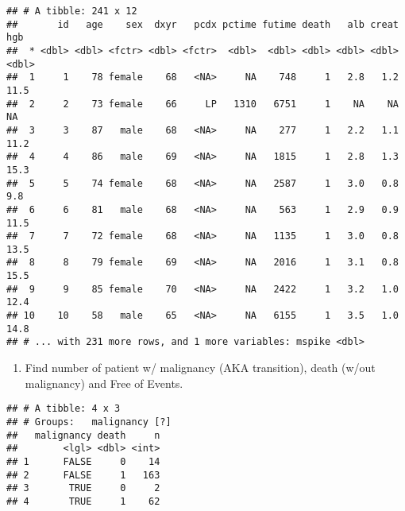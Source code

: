 \documentclass[]{book}
\newenvironment{Shaded}{\begin{snugshade}}{\end{snugshade}}
\newcommand{\KeywordTok}[1]{\textcolor[rgb]{0.13,0.29,0.53}{\textbf{{#1}}}}
\newcommand{\DataTypeTok}[1]{\textcolor[rgb]{0.13,0.29,0.53}{{#1}}}
\newcommand{\StringTok}[1]{\textcolor[rgb]{0.31,0.60,0.02}{{#1}}}
\newcommand{\NormalTok}[1]{{#1}}
\providecommand{\tightlist}{%
  \setlength{\itemsep}{0pt}\setlength{\parskip}{0pt}}
\theoremstyle{definition}
\theoremstyle{definition}
\theoremstyle{definition}
\theoremstyle{remark}
\begin{document}
\begin{verbatim}
## # A tibble: 241 x 12
##       id   age    sex  dxyr   pcdx pctime futime death   alb creat   hgb
##  * <dbl> <dbl> <fctr> <dbl> <fctr>  <dbl>  <dbl> <dbl> <dbl> <dbl> <dbl>
##  1     1    78 female    68   <NA>     NA    748     1   2.8   1.2  11.5
##  2     2    73 female    66     LP   1310   6751     1    NA    NA    NA
##  3     3    87   male    68   <NA>     NA    277     1   2.2   1.1  11.2
##  4     4    86   male    69   <NA>     NA   1815     1   2.8   1.3  15.3
##  5     5    74 female    68   <NA>     NA   2587     1   3.0   0.8   9.8
##  6     6    81   male    68   <NA>     NA    563     1   2.9   0.9  11.5
##  7     7    72 female    68   <NA>     NA   1135     1   3.0   0.8  13.5
##  8     8    79 female    69   <NA>     NA   2016     1   3.1   0.8  15.5
##  9     9    85 female    70   <NA>     NA   2422     1   3.2   1.0  12.4
## 10    10    58   male    65   <NA>     NA   6155     1   3.5   1.0  14.8
## # ... with 231 more rows, and 1 more variables: mspike <dbl>
\end{verbatim}

\begin{enumerate}
\def\labelenumi{\arabic{enumi}.}
\tightlist
\item
  Find number of patient w/ malignancy (AKA transition), death (w/out
  malignancy) and Free of Events.
\end{enumerate}

\begin{Shaded}
\end{Shaded}

\begin{verbatim}
## # A tibble: 4 x 3
## # Groups:   malignancy [?]
##   malignancy death     n
##        <lgl> <dbl> <int>
## 1      FALSE     0    14
## 2      FALSE     1   163
## 3       TRUE     0     2
## 4       TRUE     1    62
\end{verbatim}
\end{document}
